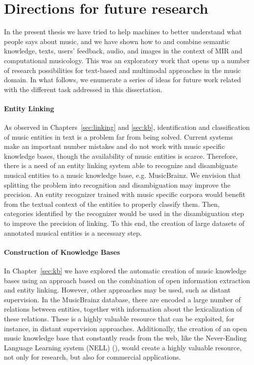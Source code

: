 \section{Directions for future research}
\label{sec:conclusion:future}

In the present thesis we have tried to help machines to better understand what people says about music, and we have shown how to and combine semantic knowledge, texts, users' feedback, audio, and images in the context of MIR and computational musicology. This was an exploratory work that opens up a number of research possibilities for text-based and multimodal approaches in the music domain. In what follows, we enumerate a series of ideas for future work related with the different task addressed in this dissertation.

\paragraph{Entity Linking} As observed in Chapters~\ref{sec:linking} and \ref{sec:kb}, identification and classification of music entities in text is a problem far from being solved. Current systems make an important number mistakes and do not work with music specific knowledge bases, though the availability of music entities is scarce. Therefore, there is a need of an entity linking system able to recognize and disambiguate musical entities to a music knowledge base, e.g. MusicBrainz. We envision that splitting the problem into recognition and disambiguation may improve the precision. An entity recognizer trained with music specific corpora would benefit from the textual context of the entities to properly classify them. Then, categories identified by the recognizer would be used in the disambiguation step to improve the precision of linking. To this end, the creation of large datasets of annotated musical entities is a necessary step. %

\paragraph{Construction of Knowledge Bases} In Chapter~\ref{sec:kb} we have explored the automatic creation of music knowledge bases using an approach based on the combination of open information extraction and entity linking. However, other approaches may be used, such as distant supervision. In the MusicBrainz database, there are encoded a large number of relations between entities, together with information about the lexicalization of these relations. These is a highly valuable resource that can be exploited, for instance, in distant supervision approaches. Additionally, the creation of an open music knowledge base that constantly reads from the web, like the Never-Ending Language Learning system (NELL) (\cite{Carlson2010a}), would create a highly valuable resource, not only for research, but also for commercial applications.

